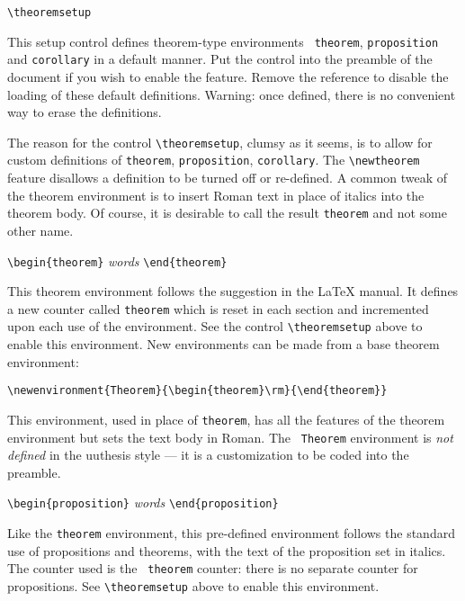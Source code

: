 \verb|\theoremsetup|

\noindent This setup control defines theorem-type environments {\tt
theorem}, {\tt proposition} and {\tt corollary} in a default manner. Put
the control into the preamble of the document if you wish to enable the
feature. Remove the reference to disable the loading of these default
definitions. Warning: once defined, there is no convenient way to erase
the definitions.

The reason for the control \verb"\theoremsetup", clumsy as it seems, is
to allow for custom definitions of {\tt theorem}, {\tt proposition},
{\tt corollary}. The \verb"\newtheorem" feature disallows a definition
to be turned off or re-defined. A common tweak of the theorem
environment is to insert Roman text in place of italics into the theorem
body. Of course, it is desirable to call the result {\tt theorem} and
not some other name.

\medskip

\verb|\begin{theorem}| {\em words} \verb|\end{theorem}|

\noindent This theorem environment follows the suggestion in the
\LaTeX{} manual. It defines a new counter called {\tt theorem} which is
reset in each section and incremented upon each use of the environment.
See the control \verb|\theoremsetup| above to enable this environment.
New environments can be made from a base theorem environment:

\medskip

\verb|\newenvironment{Theorem}{\begin{theorem}\rm}{\end{theorem}}|

This environment, used in place of {\tt theorem}, has all the features
of the theorem environment but sets the text body in Roman. The {\tt
Theorem} environment is {\em not defined} in the uuthesis style --- it
is a customization to be coded into the preamble.


\medskip

\verb|\begin{proposition}| {\em words} \verb|\end{proposition}|

\noindent Like the {\tt theorem} environment, this pre-defined
environment follows the standard use of propositions and theorems, with
the text of the proposition set in italics. The counter used is the {\tt
theorem} counter: there is no separate counter for propositions. See
\verb|\theoremsetup| above to enable this environment.

